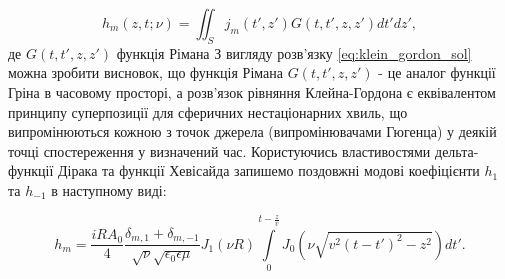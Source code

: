 \begin{equation} \label{eq:klein_gordon_sol}
h_m (z, t; \nu) = \iint_S j_m (t',z') G(t,t',z,z') dt' dz',
\end{equation}
%
де $ G(t,t',z,z') $ функція Рімана 
%
%
З вигляду розв'язку \eqref{eq:klein_gordon_sol} можна зробити висновок, що
функція Рімана $ G(t,t',z,z') $ - це аналог функції Гріна в часовому просторі,
а розв'язок рівняння Клейна-Гордона є еквівалентом принципу суперпозиції
для сферичних нестаціонарних хвиль, що випромінюються кожною з точок джерела
(випромінювачами Гюгенца) у деякій точці спостереження у визначений час.
%
%
%
Користуючись властивостями дельта-функції Дірака та функції Хевісайда 
запишемо поздовжні модові коефіцієнти $ h_1 $ та $ h_{-1} $ в наступному 
виді:

\begin{equation} \label{eq:hm_int}
h_m = \frac{i R A_0}{4} \frac{\delta_{m,1} + \delta_{m,-1}}
{\sqrt{\nu} \sqrt{\epsilon_0 \epsilon \mu}} J_1 (\nu R) 
\int \limits_{0}^{t - \frac{z}{v}} 
J_0 \left( \nu \sqrt{v^2 (t-t')^2 - z^2} \right) dt'.
\end{equation}

